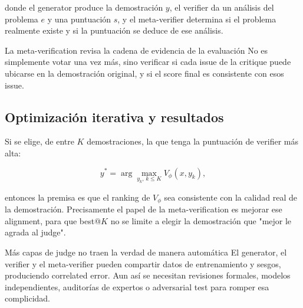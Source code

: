 \documentclass[a4paper]{article}
\begin{document}
donde el generator produce la demostración $y$, el verifier da un análisis del problema $e$ y una puntuación $s$, y el meta-verifier determina si el problema realmente existe y si la puntuación se deduce de ese análisis.


\begin{importantbox}{La meta-verification revisa la cadena de evidencia de la evaluación}
No es simplemente votar una vez más, sino verificar si cada issue de la critique puede ubicarse en la demostración original, y si el score final es consistente con esos issue.
\end{importantbox}

\subsection{Optimización iterativa y resultados}




Si se elige, de entre $K$ demostraciones, la que tenga la puntuación de verifier más alta:

$$
y^*=\arg\max_{y_k,\,k\le K}V_\phi(x,y_k),
$$

entonces la premisa es que el ranking de $V_\phi$ sea consistente con la calidad real de la demostración. Precisamente el papel de la meta-verification es mejorar ese alignment, para que best@$K$ no se limite a elegir la demostración que "mejor le agrada al judge".

\begin{warningbox}{Más capas de judge no traen la verdad de manera automática}
El generator, el verifier y el meta-verifier pueden compartir datos de entrenamiento y sesgos, produciendo correlated error. Aun así se necesitan revisiones formales, modelos independientes, auditorías de expertos o adversarial test para romper esa complicidad.
\end{warningbox}
\end{document}
